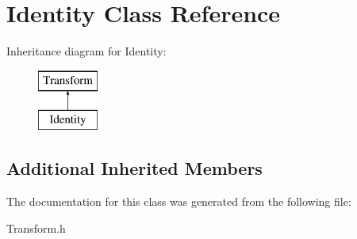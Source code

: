 \hypertarget{class_identity}{}\section{Identity Class Reference}
\label{class_identity}
Inheritance diagram for Identity\+:\begin{figure}[H]
\begin{center}
\leavevmode
\includegraphics[height=2.000000cm]{class_identity}
\end{center}
\end{figure}
\subsection*{Additional Inherited Members}


The documentation for this class was generated from the following file\+:\begin{DoxyCompactItemize}
\item 
Transform.\+h\end{DoxyCompactItemize}
